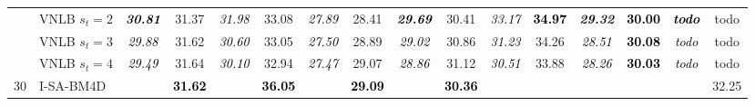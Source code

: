 \documentclass[10pt, journal, twocolumn, final, a4paper]{IEEEtran}
\newcommand{\bsic}[1]{\textcolor{black}{\textit{#1}}}
\newcommand{\Bsic}[1]{\textcolor{black}{\textbf{\textit{#1}}}}
\newcommand{\Best}[1]{\textbf{\textcolor{black}{#1}}}
\begin{document}
\begin{table}[htp!]
\begin{center}
{\begin{tabular}{ c | l |c c | c c | c c | c c | c c | c c | c c}
										 & VNLB   $s_t = 2$     & \Bsic{30.81} &       31.37  & \bsic{31.98} &       33.08   & \bsic{27.89} &       28.41   & \Bsic{29.69} &       30.41  & \bsic{33.17} & \Best{34.97}  & \Bsic{29.32} & \Best{30.00} & \Bsic{todo } &       todo   \\
			                      & VNLB   $s_t = 3$     & \bsic{29.88} &       31.62  & \bsic{30.60} &       33.05   & \bsic{27.50} &       28.89   & \bsic{29.02} &       30.86  & \bsic{31.23} &       34.26   & \bsic{28.51} & \Best{30.08} & \bsic{todo } &       todo   \\
			                      & VNLB   $s_t = 4$     & \bsic{29.49} &       31.64  & \bsic{30.10} &       32.94   & \bsic{27.47} &       29.07   & \bsic{28.86} &       31.12  & \bsic{30.51} &       33.88   & \bsic{28.26} & \Best{30.03} & \bsic{todo } &       todo   \\\hline
%                                                                                                                                                                                                                                                                         
			\multirow{1}{*}{$30$}                                                                                                                                                                                                                                            
			                      & I-SA-BM4D            & \bsic{     } & \Best{31.62} & \bsic{     } & \Best{36.05}  & \bsic{     } & \Best{29.09}  & \bsic{     } & \Best{30.36} &              &               &              &              & \bsic{     } &       32.25  \\

\end{tabular}}
\end{center}
\end{table}
\end{document}
